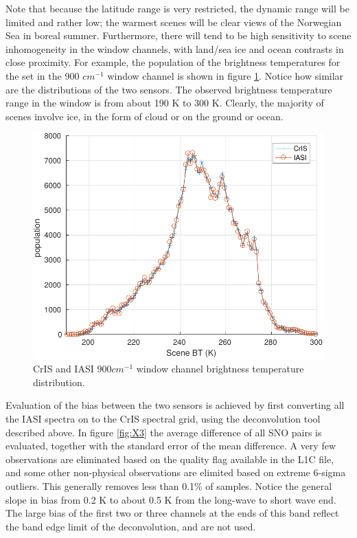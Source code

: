 \documentclass[twocolumn,10pt]{article}
\begin{document}
Note that because the latitude range is very restricted, the dynamic range will be limited and rather low; the warmest scenes will be clear views of the Norwegian Sea in boreal summer.  Furthermore, there will tend to be high sensitivity to scene inhomogeneity in the window channels, with land/sea ice and ocean contrasts in close proximity. For example, the population of
the brightness temperatures for the set in the 900 \(cm^{-1}\) window channel is shown in figure \ref{fig:X2}. Notice how similar are the distributions of the two sensors.
The observed brightness temperature range in the window is from about 190 K to 300 K. Clearly,
the majority of scenes involve ice, in the form of cloud or on the ground or ocean.

\begin{figure}[htb]
\centering
\includegraphics[width=\linewidth]{./figs/IC_jplSNO_900wn_hist_vs_scene.pdf}
\caption{\label{fig:orgparagraph4}
  CrIS and IASI $900 cm^{-1}$ window channel brightness temperature distribution.}
\label{fig:X2}
\end{figure}

Evaluation of the bias between the two sensors is achieved by first converting all the
IASI spectra on to the CrIS spectral grid, using the deconvolution tool described above.
In figure \ref{fig:X3} the average difference of all SNO pairs
is evaluated, together with the standard error of the mean difference. A very few
observations are eliminated based on the quality flag available in the L1C file, and some other non-physical observations are elimited based on extreme 6-sigma outliers. This generally removes less than  0.1\%  of samples. Notice the general slope in bias from 0.2 K to about 0.5 K from the long-wave to short wave end. The large bias of the first two or three channels at the ends of this band reflect the band edge limit of the deconvolution, and are not used.
\end{document}
